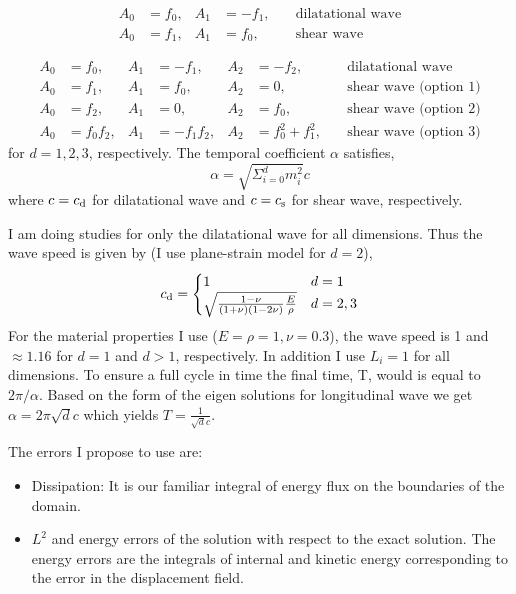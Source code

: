 \documentclass[12pt]{article}
\newcommand{\CS}{c_{\text s}}
\newcommand{\CD}{c_{\text d}}   %
\begin{document}
\begin{subequations}
\begin{align}
A_0 &= f_0, &A_1 &= -f_1,  \quad &\text{dilatational wave} \\
A_0 &= f_1, &A_1 &= f_0,  \quad &\text{shear wave}
\end{align}
\end{subequations}

\begin{subequations}
\begin{align}
A_0 &= f_0, &A_1 &= -f_1,  &A_2 &= -f_2,  \quad &\text{dilatational wave} \\
A_0 &= f_1, &A_1 &= f_0,  &A_2 &= 0,  \quad &\text{shear wave (option 1)} \\
A_0 &= f_2, &A_1 &= 0,  &A_2 &= f_0,  \quad &\text{shear wave (option 2)} \\
A_0 &= f_0 f_2, &A_1 &= -f_1 f_2,  &A_2 &= f_0^2 + f_1^2,  \quad &\text{shear wave (option 3)}
\end{align}
\end{subequations}
%
for $d = 1, 2, 3$, respectively. The temporal coefficient $\alpha$ satisfies,
%
\begin{equation}
\alpha = \sqrt{\Sigma_{i=0}^d m_i^2} c
\end{equation}
%
where $c = \CD$ for dilatational wave and $c = \CS$ for shear wave, respectively.

I am doing studies for only the dilatational wave for all dimensions. Thus the wave speed is given by (I use plane-strain model for $d = 2$),
%
\begin{equation}
\CD = \begin{cases} 
1 & d = 1 \\
\sqrt{ \frac{ 1 - \nu} {(1 + \nu)  (1 - 2  \nu) } \frac{E}{\rho}} & d = 2,3
\end{cases}
\end{equation}
%
For the material properties I use ($E = \rho = 1, \nu = 0.3$), the wave speed is 1 and $\approx 1.16$ for $d = 1$ and $ d > 1$, respectively. In addition I use $L_i = 1$ for all dimensions. To ensure a full cycle in time the final time, T, would is equal to $2 \pi / \alpha$.  Based on the form of the eigen solutions for longitudinal wave we get  $\alpha = 2 \pi \sqrt{d} c $ which yields $T = \frac{1} {\sqrt d c}$. 

The errors I propose to use are:

\begin{itemize}
\item Dissipation: It is our familiar integral of energy flux on the boundaries of the domain. 
\item $L^2$ and energy errors of the solution with respect to the exact solution. The energy errors are the integrals of internal and kinetic energy corresponding to the error in the displacement field.
\end{itemize}
\end{document}
